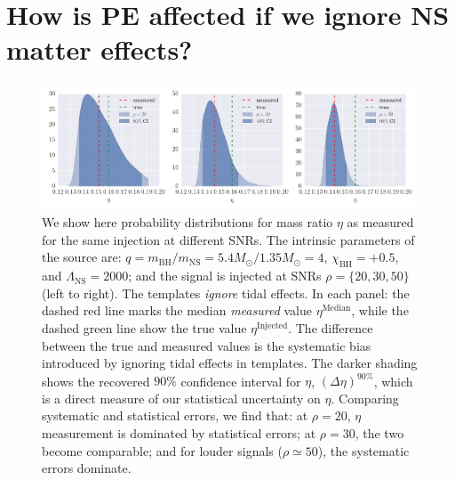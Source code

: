 \documentclass[aps,prd,amsmath,floats,floatfix, twocolumn,
superscriptaddress,nofootinbib,showpacs]{revtex4-1}
\newcommand{\lambdans}{\Lambda_\mathrm{NS}}
\newcommand{\chibh}{\chi_\mathrm{BH}}
\newcommand{\mbh}{m_\mathrm{BH}}
\newcommand{\mns}{m_\mathrm{NS}}
\begin{document}
\section{How is PE affected if we ignore NS matter effects?}\label{s1:PEwithnoNS}
\begin{figure}
\centering 
\includegraphics[width=1.8\columnwidth]{plots/SingleSystemEta_q4_0_mc2_25_chi0_50}
\caption{We show here probability distributions for mass ratio $\eta$ as measured
for the same injection at different SNRs. The intrinsic parameters of the source
are: $q = \mbh/\mns = 5.4M_\odot/1.35M_\odot = 4$, $\chibh=+0.5$, and $\lambdans=2000$;
and the signal is injected at SNRs $\rho=\{20,30,50\}$ (left to right). The templates
{\it ignore} tidal effects.
% 
In each panel: the dashed red line marks the median {\it measured} value
$\eta^\mathrm{Median}$, while the dashed green line show the true value
$\eta^\mathrm{Injected}$. The difference between the true and measured values
is the systematic bias introduced
by ignoring tidal effects in templates. The darker shading shows
the recovered $90\%$ confidence interval for $\eta$, $(\Delta\eta)^{90\%}$, 
which is a direct measure of our statistical uncertainty on $\eta$.
% 
Comparing systematic and statistical errors, we find that:
at $\rho=20$, $\eta$ measurement is dominated by statistical
errors; at $\rho=30$, the two become comparable; and 
for louder signals ($\rho\simeq50$), the systematic errors dominate.
}
\label{fig:SingleSystemEtaPDFvsSNR}
\end{figure}
\end{document}
